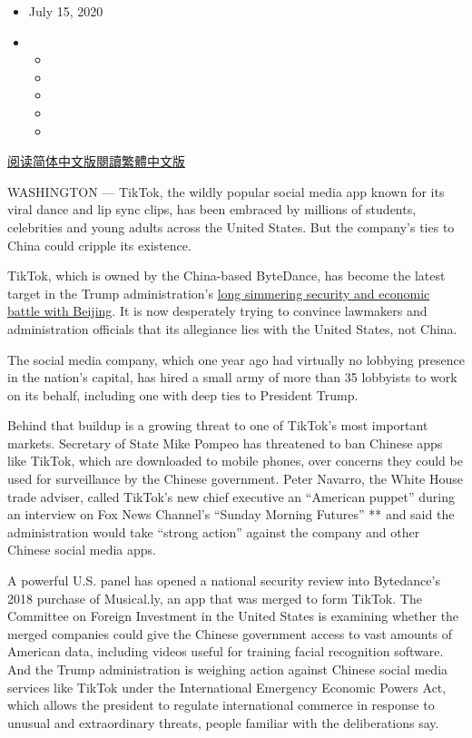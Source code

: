 \begin{itemize}
\item
  July 15, 2020
\item
  \begin{itemize}
  \item
  \item
  \item
  \item
  \item
  \end{itemize}
\end{itemize}

\href{https://cn.nytimes.com/technology/20200716/tiktok-washington-lobbyist/}{阅读简体中文版}\href{https://cn.nytimes.com/technology/20200716/tiktok-washington-lobbyist/zh-hant/}{閱讀繁體中文版}

WASHINGTON --- TikTok, the wildly popular social media app known for its
viral dance and lip sync clips, has been embraced by millions of
students, celebrities and young adults across the United States. But the
company's ties to China could cripple its existence.

TikTok, which is owned by the China-based ByteDance, has become the
latest target in the Trump administration's
\href{https://www.nytimes.com/2020/01/20/business/economy/trump-us-china-deal-micron-trade-war.html}{long
simmering security and economic battle with Beijing}. It is now
desperately trying to convince lawmakers and administration officials
that its allegiance lies with the United States, not China.

The social media company, which one year ago had virtually no lobbying
presence in the nation's capital, has hired a small army of more than 35
lobbyists to work on its behalf, including one with deep ties to
President Trump.

Behind that buildup is a growing threat to one of TikTok's most
important markets. Secretary of State Mike Pompeo has threatened to ban
Chinese apps like TikTok, which are downloaded to mobile phones, over
concerns they could be used for surveillance by the Chinese government.
Peter Navarro, the White House trade adviser, called TikTok's new chief
executive an ``American puppet'' during an interview on Fox News
Channel's ``Sunday Morning Futures'' ** and said the administration
would take ``strong action'' against the company and other Chinese
social media apps.

A powerful U.S. panel has opened a national security review into
Bytedance's 2018 purchase of Musical.ly, an app that was merged to form
TikTok. The Committee on Foreign Investment in the United States is
examining whether the merged companies could give the Chinese government
access to vast amounts of American data, including videos useful for
training facial recognition software. And the Trump administration is
weighing action against Chinese social media services like TikTok under
the International Emergency Economic Powers Act, which allows the
president to regulate international commerce in response to unusual and
extraordinary threats, people familiar with the deliberations say.

